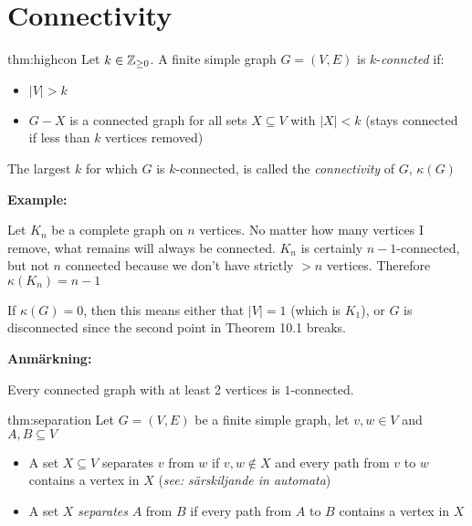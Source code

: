 \section{Connectivity}\par
\begin{theo}{thm:highcon}
  Let $k\in\mathbb{Z}_{\geq0}$. A finite simple graph $G = (V,E)$ is $k$-\textit{conncted} if:\par
  \begin{itemize}
    \item $\left|V\right|>k$\par
    \item $G-X$ is a connected graph for all sets $X\subseteq V$ with $\left|X\right|<k$ (stays connected if less than $k$ vertices removed)
  \end{itemize}
  \par\bigskip
  \noindent The largest $k$ for which $G$ is $k$-connected, is called the \textit{connectivity} of $G$, $\kappa(G)$
\end{theo}
\par\bigskip
\noindent\textbf{Example:}\par
\noindent Let $K_n$ be a complete graph on $n$ vertices. No matter how many vertices I remove, what remains will always be connected. $K_n$ is certainly $n-1$-connected, but not $n$ connected because we don't have strictly $>n$ vertices. Therefore $\kappa(K_n) = n-1$
\par\bigskip
\noindent If $\kappa(G) = 0$, then this means either that $\left|V\right| = 1$ (which is $K_1$), or $G$ is disconnected since the second point in Theorem 10.1 breaks.
\par\bigskip
\noindent\textbf{Anmärkning:}\par
\noindent Every connected graph with at least 2 vertices is $1$-connected.
\par\bigskip
\begin{theo}[Separation]{thm:separation}
  Let $G = (V,E)$ be a finite simple graph, let $v,w\in V$ and $A,B\subseteq V$\par
  \begin{itemize}
    \item A set $X\subseteq V$ separates $v$ from $w$ if $v,w\not\in X$ and every path from $v$ to $w$ contains a vertex in $X$ (\textit{see: särskiljande in automata})\par
    \item A set $X$ \textit{separates} $A$ from $B$ if every path from $A$ to $B$ contains a vertex in $X$
  \end{itemize}
\end{theo}
